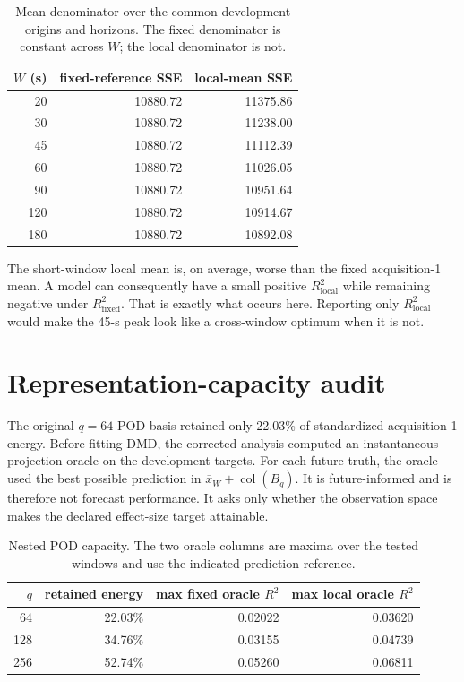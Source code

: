 \documentclass[11pt]{article}
\newcommand{\Rfixed}{R^2_{\mathrm{fixed}}}
\newcommand{\Rlocal}{R^2_{\mathrm{local}}}
\begin{document}
\begin{table}[htbp]
\centering
\caption{Mean denominator over the common development origins and horizons.
The fixed denominator is constant across \(W\); the local denominator is not.}
\label{tab:denominators}
\begin{tabular}{rrr}
\toprule
\(W\) (s) & fixed-reference SSE & local-mean SSE \\
\midrule
20  & 10880.72 & 11375.86 \\
30  & 10880.72 & 11238.00 \\
45  & 10880.72 & 11112.39 \\
60  & 10880.72 & 11026.05 \\
90  & 10880.72 & 10951.64 \\
120 & 10880.72 & 10914.67 \\
180 & 10880.72 & 10892.08 \\
\bottomrule
\end{tabular}
\end{table}

The short-window local mean is, on average, worse than the fixed
acquisition-1 mean.  A model can consequently have a small positive
\(\Rlocal\) while remaining negative under \(\Rfixed\).  That is exactly what
occurs here.  Reporting only \(\Rlocal\) would make the 45-s peak look like a
cross-window optimum when it is not.

\section{Representation-capacity audit}

The original \(q=64\) POD basis retained only 22.03\% of standardized
acquisition-1 energy.  Before fitting DMD, the corrected analysis computed an
instantaneous projection oracle on the development targets.  For each future
truth, the oracle used the best possible prediction in
\(\overline x_W+\operatorname{col}(B_q)\).  It is future-informed and is
therefore not forecast performance.  It asks only whether the observation
space makes the declared effect-size target attainable.

\begin{table}[htbp]
\centering
\caption{Nested POD capacity.  The two oracle columns are maxima over the
tested windows and use the indicated prediction reference.}
\label{tab:oracle}
\begin{tabular}{rrrr}
\toprule
\(q\) & retained energy & max fixed oracle \(R^2\) & max local oracle \(R^2\) \\
\midrule
64  & 22.03\% & 0.02022 & 0.03620 \\
128 & 34.76\% & 0.03155 & 0.04739 \\
256 & 52.74\% & 0.05260 & 0.06811 \\
\bottomrule
\end{tabular}
\end{table}
\end{document}
